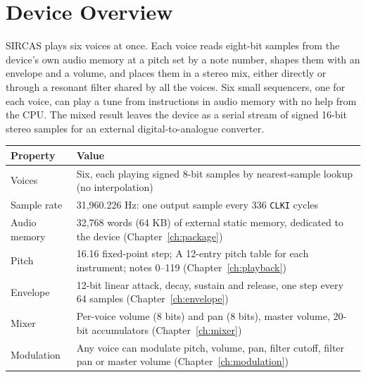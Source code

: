 \section{Device Overview}

SIRCAS plays six voices at once. Each voice reads eight-bit samples from the device's own audio memory at a pitch set
by a note number, shapes them with an envelope and a volume, and places them in a stereo mix, either directly or
through a resonant filter shared by all the voices. Six small sequencers, one for each voice, can play a tune from
instructions in audio memory with no help from the CPU. The mixed result leaves the device as a serial stream of signed
16-bit stereo samples for an external digital-to-analogue converter.

\begin{table}[H]
	\centering
	\begin{tabular}{lp{9cm}}
		\toprule
		\textbf{Property} & \textbf{Value}                                                                                                                                       \\
		\midrule
		Voices            & Six, each playing signed 8-bit samples by nearest-sample lookup (no interpolation)                                                                   \\
		Sample rate       & 31,960.226 Hz: one output sample every 336 \texttt{CLKI} cycles                                                                                      \\
		Audio memory      & 32,768 words (64 KB) of external static memory, dedicated to the device (Chapter~\ref{ch:package})                                                   \\
		Pitch             & 16.16 fixed-point step; A 12-entry pitch table for each instrument; notes 0--119 (Chapter~\ref{ch:playback})                                         \\
		Envelope          & 12-bit linear attack, decay, sustain and release, one step every 64 samples (Chapter~\ref{ch:envelope})                                              \\
		Mixer             & Per-voice volume (8 bits) and pan (8 bits), master volume, 20-bit accumulators (Chapter~\ref{ch:mixer})                                              \\
		Modulation        & Any voice can modulate pitch, volume, pan, filter cutoff, filter pan or master volume (Chapter~\ref{ch:modulation})                                  \\

\end{tabular}
\end{table}
